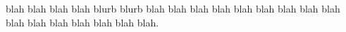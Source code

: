 \documentclass[11pt,a4paper]{article}
\begin{document}
\begin{ledgroup}
\beginnumbering
{}%
\Xafternumber{1em}
\pstart 
\noindent
 blah blah blah blah blurb blurb
blah blah blah blah blah
blah blah 
blah blah blah blah
  blah blah blah blah blah.
\pend
\endnumbering
\end{ledgroup}
\end{document}
